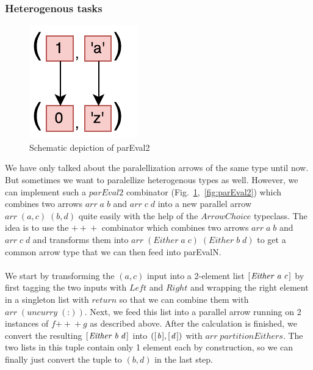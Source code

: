 \documentclass{jfp1}
\newcommand{\Conid}[1]{\mathit{#1}}
\newcommand{\Varid}[1]{\mathit{#1}}
\begin{document}
\subsubsection{Heterogenous tasks}
\begin{figure}[h]
	\includegraphics[scale=0.7]{images/parEval2}
	\caption{Schematic depiction of parEval2}
	\label{fig:parEval2Img}
\end{figure}
We have only talked about the paralellization arrows of the same type until now. But sometimes we want to paralellize heterogenous types as well. However, we can implement such a \ensuremath{\Varid{parEval2}} combinator (Fig.~\ref{fig:parEval2Img},~\ref{fig:parEval2}) which combines two arrows \ensuremath{\Varid{arr}\;\Varid{a}\;\Varid{b}} and \ensuremath{\Varid{arr}\;\Varid{c}\;\Varid{d}} into a new parallel arrow \ensuremath{\Varid{arr}\;(\Varid{a},\Varid{c})\;(\Varid{b},\Varid{d})} quite easily with the help of the \ensuremath{\Conid{ArrowChoice}} typeclass. The idea is to use the \ensuremath{\mathbin{+\!\!+\!\!+}} combinator which combines two arrows \ensuremath{\Varid{arr}\;\Varid{a}\;\Varid{b}} and \ensuremath{\Varid{arr}\;\Varid{c}\;\Varid{d}} and transforms them into \ensuremath{\Varid{arr}\;(\Conid{Either}\;\Varid{a}\;\Varid{c})\;(\Conid{Either}\;\Varid{b}\;\Varid{d})} to get a common arrow type that we can then feed into parEvalN.
\\\\
We start by transforming the \ensuremath{(\Varid{a},\Varid{c})} input into a 2-element list \ensuremath{[\mskip1.5mu \Conid{Either}\;\Varid{a}\;\Varid{c}\mskip1.5mu]} by first tagging the two inputs with \ensuremath{\Conid{Left}} and \ensuremath{\Conid{Right}} and wrapping the right element in a singleton list with \ensuremath{\Varid{return}} so that we can combine them with \ensuremath{\Varid{arr}\;(\Varid{uncurry}\;(\mathbin{:}))}. Next, we feed this list into a parallel arrow running on 2 instances of \ensuremath{\Varid{f}\mathbin{+\!\!+\!\!+}\Varid{g}} as described above. After the calculation is finished, we convert the resulting \ensuremath{[\mskip1.5mu \Conid{Either}\;\Varid{b}\;\Varid{d}\mskip1.5mu]} into \ensuremath{([\mskip1.5mu \Varid{b}\mskip1.5mu],[\mskip1.5mu \Varid{d}\mskip1.5mu])} with \ensuremath{\Varid{arr}\;\Varid{partitionEithers}}. The two lists in this tuple contain only 1 element each by construction, so we can finally just convert the tuple to \ensuremath{(\Varid{b},\Varid{d})} in the last step.
\end{document}
